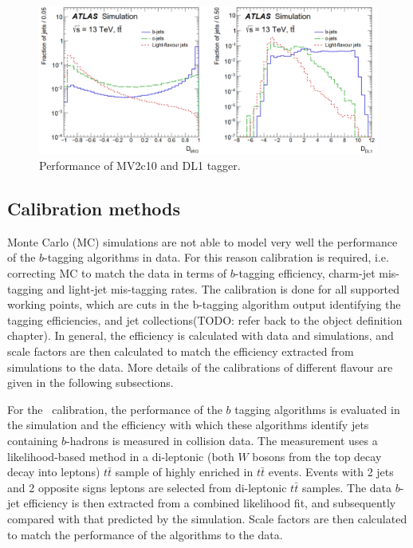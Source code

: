 \documentclass[letterpaper,12pt]{article}
\begin{document}
\begin{figure}
\includegraphics[width=1\textwidth]{MV2_DL1.png}
\caption{Performance of MV2c10 and DL1 tagger\cite{FTAG-2018-01}.}\label{fig:MV2_DL1}
\end{figure}

\subsection{Calibration methods}
Monte Carlo (MC) simulations are not able to model very well the performance of the $b$-tagging algorithms in data. For this reason calibration is required, i.e. correcting MC to match the data in terms of $b$-tagging efficiency, charm-jet mis-tagging and light-jet mis-tagging rates\cite{FTAG-2018-01}. The calibration is done for all supported working points, which are cuts in the b-tagging algorithm output identifying the tagging efficiencies, and jet collections(TODO: refer back to the object definition chapter). In general, the efficiency is calculated with data and simulations, and scale factors are then calculated to match the efficiency extracted from simulations to the data. More details of the calibrations of different flavour are given in the following subsections.


For the \bjet\  calibration, the performance of the $b$ tagging algorithms is evaluated in the simulation and the efficiency with which these algorithms identify jets containing $b$-hadrons is measured in collision data. The measurement uses a likelihood-based method in a di-leptonic (both $W$ bosons from the top decay decay into leptons) $t\bar{t}$ sample of highly enriched in $t\bar{t}$ events. Events with 2 jets and 2 opposite signs leptons are selected from di-leptonic $t\bar{t}$ samples. The data $b$-jet efficiency is then extracted from a combined likelihood fit, and subsequently compared with that predicted by the simulation. Scale factors are then calculated to match the performance of the algorithms to the data\cite{FTAG-2018-01}.
\end{document}
